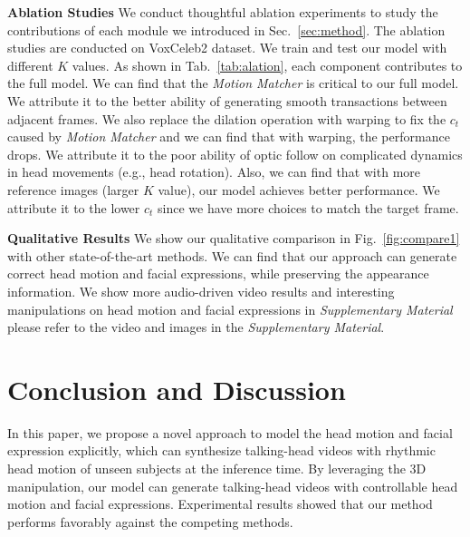 \documentclass[runningheads]{llncs}
\begin{document}
\noindent \textbf{Ablation Studies} \quad We conduct thoughtful ablation experiments to study the contributions of each module we introduced in Sec.~\ref{sec:method}. The ablation studies are conducted on VoxCeleb2 dataset. We train and test our model with different $K$ values.
As shown in Tab.~\ref{tab:alation}, each component contributes to the full model. We can find that the \textit{Motion Matcher} is critical to our full model. We attribute it to the better ability of generating smooth transactions between adjacent frames. We also replace the dilation operation with warping to fix the $c_t$ caused by \textit{Motion Matcher} and we can find that with warping, the performance drops. We attribute it to the poor ability of optic follow on complicated dynamics in head movements (e.g., head rotation). Also, we can find that with more reference images (larger $K$ value), our model achieves better performance. We attribute it to the lower $c_t$ since we have more choices to match the target frame. 

\noindent \textbf{Qualitative Results} \quad We show our qualitative comparison in Fig.~\ref{fig:compare1} with other state-of-the-art methods. We can find that our approach can generate correct head motion and facial expressions, while preserving the appearance information. We show more audio-driven video results and interesting manipulations on head motion and facial expressions in \textit{Supplementary Material}   please refer to the video and images in the \textit{Supplementary Material}.

\section{Conclusion and Discussion}
In this paper, we propose a novel approach to model the head motion and facial expression explicitly, which can synthesize talking-head videos with rhythmic head motion of unseen subjects at the inference time. By leveraging the 3D manipulation, our model can generate talking-head videos with controllable head motion and facial expressions. Experimental results showed that our method performs favorably against the competing methods.
  

\clearpage
%
%


\end{document}
